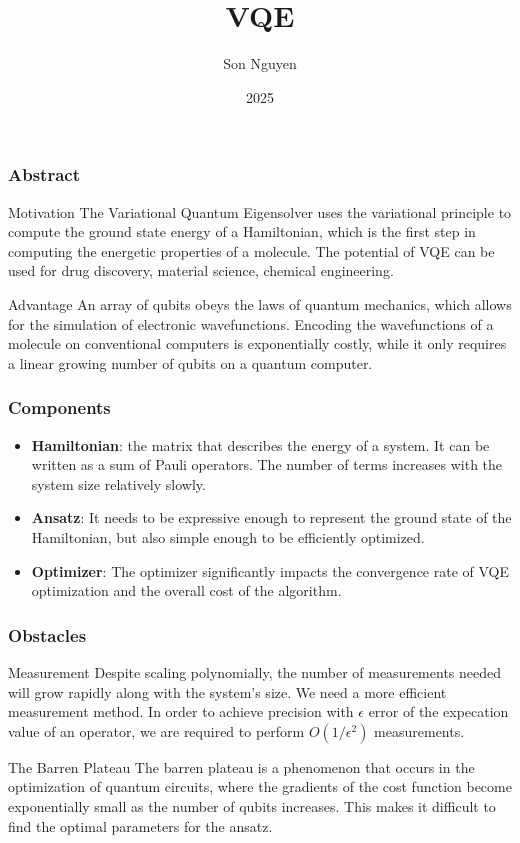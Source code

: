 \documentclass{beamer}
\title{VQE}
\author{Son Nguyen}
\institute{Stevens Institute of Technology}
\date{2025}
\begin{document}
\frame{\titlepage}
\begin{frame}
    \frametitle{Abstract}
    \begin{block}{Motivation}
        The Variational Quantum Eigensolver uses the variational principle to
         compute the ground state energy of a Hamiltonian, which is the first step in computing 
         the energetic properties of a molecule. The potential of VQE can be used for drug discovery,
         material science, chemical engineering.
    \end{block}
    \begin{block}{Advantage}
        An array of qubits obeys the laws of quantum mechanics, which allows for the simulation of electronic
         wavefunctions. Encoding the wavefunctions of a molecule on conventional computers is exponentially costly, while it only
         requires a linear growing number of qubits on a quantum computer.
    \end{block}
\end{frame}
\begin{frame}
    \frametitle{Components}
    \begin{itemize}
        \item \textbf{Hamiltonian}: the matrix that describes the energy of a system. It can be written as a sum of Pauli operators. The number
         of terms increases with the system size relatively slowly.
        \item \textbf{Ansatz}: It needs to be expressive enough to represent the ground state of the Hamiltonian, but also simple enough to be
         efficiently optimized. 
        \item \textbf{Optimizer}: The optimizer significantly impacts the convergence rate of VQE optimization and the overall cost of the algorithm.
    \end{itemize}
\end{frame}
\begin{frame}
    \frametitle{Obstacles}
    \begin{block}{Measurement}
        Despite scaling polynomially, the number of measurements needed will grow rapidly along with the system's size. We need a more efficient measurement method.
        In order to achieve precision with \(\epsilon\) error of the expecation value of an operator, we are required to perform \(O(1/\epsilon^2)\) measurements.
    \end{block}
    \begin{block}{The Barren Plateau}
        The barren plateau is a phenomenon that occurs in the optimization of quantum circuits, where the gradients of the cost function become exponentially small as the number of qubits increases. This makes it difficult to find the optimal parameters for the ansatz.
    \end{block}
\end{frame}
\end{document}
